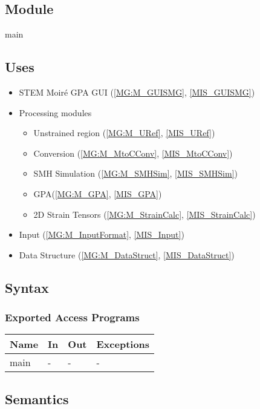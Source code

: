 \documentclass[12pt, titlepage]{article}
\begin{document}
\subsection{Module}
main
\subsection{Uses}
\begin{itemize}
\item STEM Moir{\'e} GPA GUI (\cref{MG:M_GUISMG}, \cref{MIS_GUISMG})
\item Processing modules \begin{itemize}
	\item Unstrained region (\cref{MG:M_URef}, \cref{MIS_URef})
	\item Conversion (\cref{MG:M_MtoCConv}, \cref{MIS_MtoCConv})
	\item SMH Simulation (\cref{MG:M_SMHSim}, \cref{MIS_SMHSim})
	\item GPA(\cref{MG:M_GPA}, \cref{MIS_GPA})
	\item 2D Strain Tensors (\cref{MG:M_StrainCalc}, \cref{MIS_StrainCalc})
\end{itemize}
\item Input (\cref{MG:M_InputFormat}, \cref{MIS_Input})
\item Data Structure (\cref{MG:M_DataStruct}, \cref{MIS_DataStruct})
\end{itemize}

\subsection{Syntax}

\subsubsection{Exported Access Programs}

\begin{center}
\begin{tabular}{p{2cm} p{4cm} p{4cm} p{2cm}}
\hline
\textbf{Name} & \textbf{In} & \textbf{Out} & \textbf{Exceptions} \\
\hline
main & - & - & - \\
\hline
\end{tabular}
\end{center}

\subsection{Semantics}
\end{document}
